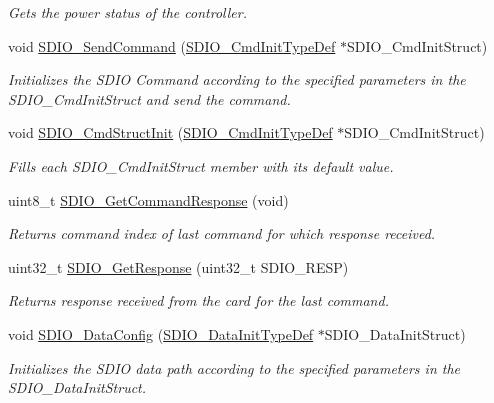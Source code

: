 \begin{DoxyCompactItemize}
\begin{DoxyCompactList}\small\item\em Gets the power status of the controller. \end{DoxyCompactList}\item 
void \hyperlink{group___s_d_i_o_ga7117d2f702703f6c0a66bc07707cab23}{S\-D\-I\-O\-\_\-\-Send\-Command} (\hyperlink{struct_s_d_i_o___cmd_init_type_def}{S\-D\-I\-O\-\_\-\-Cmd\-Init\-Type\-Def} $\ast$S\-D\-I\-O\-\_\-\-Cmd\-Init\-Struct)
\begin{DoxyCompactList}\small\item\em Initializes the S\-D\-I\-O Command according to the specified parameters in the S\-D\-I\-O\-\_\-\-Cmd\-Init\-Struct and send the command. \end{DoxyCompactList}\item 
void \hyperlink{group___s_d_i_o_ga09d9e89f49c87c82aec79c97b7068e24}{S\-D\-I\-O\-\_\-\-Cmd\-Struct\-Init} (\hyperlink{struct_s_d_i_o___cmd_init_type_def}{S\-D\-I\-O\-\_\-\-Cmd\-Init\-Type\-Def} $\ast$S\-D\-I\-O\-\_\-\-Cmd\-Init\-Struct)
\begin{DoxyCompactList}\small\item\em Fills each S\-D\-I\-O\-\_\-\-Cmd\-Init\-Struct member with its default value. \end{DoxyCompactList}\item 
uint8\-\_\-t \hyperlink{group___s_d_i_o_ga9badf271c818e09da301d715c4ad0e5b}{S\-D\-I\-O\-\_\-\-Get\-Command\-Response} (void)
\begin{DoxyCompactList}\small\item\em Returns command index of last command for which response received. \end{DoxyCompactList}\item 
uint32\-\_\-t \hyperlink{group___s_d_i_o_ga5c1e859511840e8cca6a9a768bce220b}{S\-D\-I\-O\-\_\-\-Get\-Response} (uint32\-\_\-t S\-D\-I\-O\-\_\-\-R\-E\-S\-P)
\begin{DoxyCompactList}\small\item\em Returns response received from the card for the last command. \end{DoxyCompactList}\item 
void \hyperlink{group___s_d_i_o_gad65d896ae919683585bda44a1e2afae4}{S\-D\-I\-O\-\_\-\-Data\-Config} (\hyperlink{struct_s_d_i_o___data_init_type_def}{S\-D\-I\-O\-\_\-\-Data\-Init\-Type\-Def} $\ast$S\-D\-I\-O\-\_\-\-Data\-Init\-Struct)
\begin{DoxyCompactList}\small\item\em Initializes the S\-D\-I\-O data path according to the specified parameters in the S\-D\-I\-O\-\_\-\-Data\-Init\-Struct. \end{DoxyCompactList}\item 

\end{DoxyCompactItemize}
